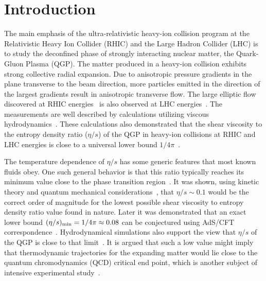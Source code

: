
\section{Introduction}
\label{sec:intro}
The main emphasis of the ultra-relativistic heavy-ion collision program at the Relativistic Heavy Ion Collider (RHIC) and the Large Hadron Collider (LHC) is to study the deconfined phase of strongly interacting nuclear matter, the Quark-Gluon Plasma (QGP). 
The matter produced in a heavy-ion collision exhibits strong collective radial expansion. Due to anisotropic pressure gradients in the plane transverse to the beam direction, more particles emitted in the direction of the largest gradients result in anisotropic transverse flow.
The large elliptic flow discovered at RHIC energies~\cite{Ackermann:2000tr} is also observed at LHC energies~\cite{Aamodt:2010pa,Adam:2016izf}. The measurements are well described by calculations utilizing viscous hydrodynamics~\cite{Romatschke:2007mq,Shen:2011eg,Schenke:2011zz,Bozek:2012qs,Gale:2012rq,Hirano:2010je}.
These calculations also demonstrated that the shear viscosity to the entropy density ratio ($\eta/s$) of the QGP in heavy-ion collisions at RHIC and LHC energies is close to a universal lower bound $1/4\pi$~\cite{Kovtun:2004de}.

The temperature dependence of $\eta/s$ has some generic features that most known fluids obey. One such general behavior is that this ratio typically reaches its minimum value close to the phase transition region~\cite{Lacey:2006bc}. 
It was shown, using kinetic theory and quantum mechanical considerations~\cite{PhysRevD.31.53}, that $\eta/s\sim0.1$ would be the correct order of magnitude for the lowest possible shear viscosity to entropy density ratio value found in nature. Later it was demonstrated that an exact lower bound $(\eta/s)_{\rm min}=1/4\pi\approx0.08$ can be conjectured using AdS/CFT correspondence~\cite{Kovtun:2004de}. Hydrodynamical simulations also support the view that $\eta/s$ of the QGP is close to that limit~\cite{Gale:2012rq}.
It is argued that such a low value might imply that thermodynamic trajectories for the expanding matter would lie close to the quantum chromodynamics (QCD) critical end point, which is another subject of intensive experimental study~\cite{Lacey:2006bc,Csernai:2006zz}.

